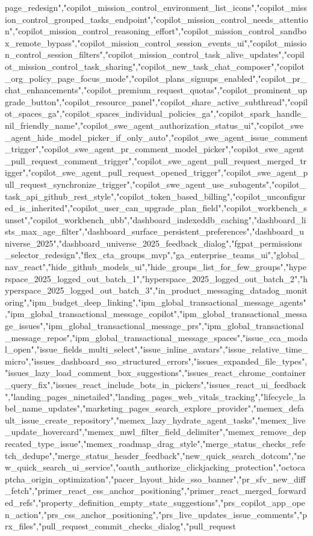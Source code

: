 page_redesign","copilot_mission_control_environment_list_icons","copilot_mission_control_grouped_tasks_endpoint","copilot_mission_control_needs_attention","copilot_mission_control_reasoning_effort","copilot_mission_control_sandbox_remote_bypass","copilot_mission_control_session_events_ui","copilot_mission_control_session_filters","copilot_mission_control_task_alive_updates","copilot_mission_control_task_sharing","copilot_new_task_chat_composer","copilot_org_policy_page_focus_mode","copilot_plans_signups_enabled","copilot_pr_chat_enhancements","copilot_premium_request_quotas","copilot_prominent_upgrade_button","copilot_resource_panel","copilot_share_active_subthread","copilot_spaces_ga","copilot_spaces_individual_policies_ga","copilot_spark_handle_nil_friendly_name","copilot_swe_agent_authorization_status_ui","copilot_swe_agent_hide_model_picker_if_only_auto","copilot_swe_agent_issue_comment_trigger","copilot_swe_agent_pr_comment_model_picker","copilot_swe_agent_pull_request_comment_trigger","copilot_swe_agent_pull_request_merged_trigger","copilot_swe_agent_pull_request_opened_trigger","copilot_swe_agent_pull_request_synchronize_trigger","copilot_swe_agent_use_subagents","copilot_task_api_github_rest_style","copilot_token_based_billing","copilot_unconfigured_is_inherited","copilot_user_can_upgrade_plan_field","copilot_workbench_sunset","copilot_workbench_ubb","dashboard_indexeddb_caching","dashboard_lists_max_age_filter","dashboard_surface_persistent_preferences","dashboard_universe_2025","dashboard_universe_2025_feedback_dialog","fgpat_permissions_selector_redesign","flex_cta_groups_mvp","ga_enterprise_teams_ui","global_nav_react","hide_github_models_ui","hide_groups_list_for_few_groups","hyperspace_2025_logged_out_batch_1","hyperspace_2025_logged_out_batch_2","hyperspace_2025_logged_out_batch_3","in_product_messaging_datadog_monitoring","ipm_budget_deep_linking","ipm_global_transactional_message_agents","ipm_global_transactional_message_copilot","ipm_global_transactional_message_issues","ipm_global_transactional_message_prs","ipm_global_transactional_message_repos","ipm_global_transactional_message_spaces","issue_cca_modal_open","issue_fields_multi_select","issue_inline_avatars","issue_relative_time_micro","issues_dashboard_sso_structured_errors","issues_expanded_file_types","issues_lazy_load_comment_box_suggestions","issues_react_chrome_container_query_fix","issues_react_include_bots_in_pickers","issues_react_ui_feedback","landing_pages_ninetailed","landing_pages_web_vitals_tracking","lifecycle_label_name_updates","marketing_pages_search_explore_provider","memex_default_issue_create_repository","memex_lazy_hydrate_agent_tasks","memex_live_update_hovercard","memex_mwl_filter_field_delimiter","memex_remove_deprecated_type_issue","memex_roadmap_drag_style","merge_status_checks_refetch_dedupe","merge_status_header_feedback","new_quick_search_dotcom","new_quick_search_ui_service","oauth_authorize_clickjacking_protection","octocaptcha_origin_optimization","pacer_layout_hide_sso_banner","pr_sfv_new_diff_fetch","primer_react_css_anchor_positioning","primer_react_merged_forwarded_refs","property_definition_empty_state_suggestions","prs_copilot_app_open_action","prs_css_anchor_positioning","prs_live_updates_issue_comments","prx_files","pull_request_commit_checks_dialog","pull_request